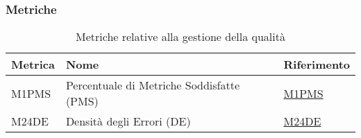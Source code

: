 \subsubsection{Metriche}
\begin{table}[H]
    \centering
    \begin{tabular}{|C{3cm}|C{4cm}|C{3cm}|}
    \hline
    \textbf{Metrica} & \textbf{Nome} & \textbf{Riferimento} \\
    \hline \hline
    M1PMS & Percentuale di Metriche Soddisfatte (PMS) &  \hyperlink{item:M1PMS}{M1PMS} \\
    M24DE & Densità degli Errori (DE) &  \hyperlink{item:M24DE}{M24DE} \\
    \hline
    \end{tabular}
    \caption{Metriche relative alla gestione della qualità}
\end{table}

